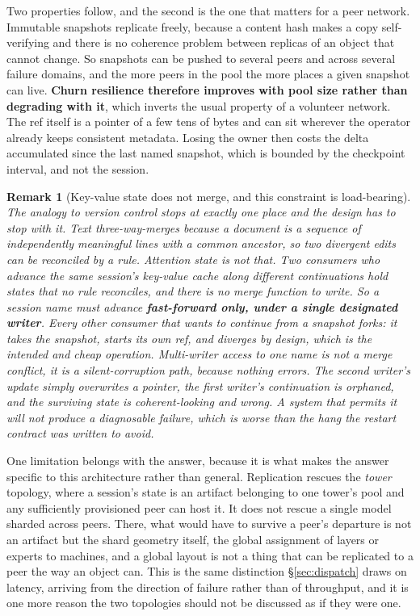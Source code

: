 \documentclass[11pt]{article}
\newtheorem{remark}{Remark}
\begin{document}
Two properties follow, and the second is the one that matters for a peer network. Immutable snapshots replicate freely, because a content hash makes a copy self-verifying and there is no coherence problem between replicas of an object that cannot change. So snapshots can be pushed to several peers and across several failure domains, and the more peers in the pool the more places a given snapshot can live. \textbf{Churn resilience therefore improves with pool size rather than degrading with it}, which inverts the usual property of a volunteer network. The ref itself is a pointer of a few tens of bytes and can sit wherever the operator already keeps consistent metadata. Losing the owner then costs the delta accumulated since the last named snapshot, which is bounded by the checkpoint interval, and not the session.

\begin{remark}[Key-value state does not merge, and this constraint is load-bearing]
\label{rem:nomerge}
The analogy to version control stops at exactly one place and the design has to stop with it. Text three-way-merges because a document is a sequence of independently meaningful lines with a common ancestor, so two divergent edits can be reconciled by a rule. Attention state is not that. Two consumers who advance the same session's key-value cache along different continuations hold states that no rule reconciles, and there is no merge function to write. So a session name must advance \textbf{fast-forward only, under a single designated writer}. Every other consumer that wants to continue from a snapshot \emph{forks}: it takes the snapshot, starts its own ref, and diverges by design, which is the intended and cheap operation. Multi-writer access to one name is not a merge conflict, it is a silent-corruption path, because nothing errors. The second writer's update simply overwrites a pointer, the first writer's continuation is orphaned, and the surviving state is coherent-looking and wrong. A system that permits it will not produce a diagnosable failure, which is worse than the hang the restart contract was written to avoid.
\end{remark}

One limitation belongs with the answer, because it is what makes the answer specific to this architecture rather than general. Replication rescues the \emph{tower} topology, where a session's state is an artifact belonging to one tower's pool and any sufficiently provisioned peer can host it. It does not rescue a single model sharded across peers. There, what would have to survive a peer's departure is not an artifact but the shard geometry itself, the global assignment of layers or experts to machines, and a global layout is not a thing that can be replicated to a peer the way an object can. This is the same distinction \S\ref{sec:dispatch} draws on latency, arriving from the direction of failure rather than of throughput, and it is one more reason the two topologies should not be discussed as if they were one.
\end{document}
